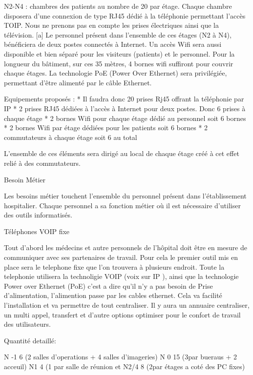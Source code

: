 N2-N4 : chambres des patients au nombre de 20 par étage.  Chaque chambre disposera d’une connexion de type RJ45 dédié à la téléphonie permettant l’accès TOIP. Nous ne prenons pas en compte les prises électriques ainsi que la télévision. [a]
Le personnel présent dans l’ensemble de ces étages (N2 à N4), bénéficiera de deux postes connectés à Internet.
Un accès Wifi sera aussi disponible et bien séparé pour les visiteurs (patients) et le personnel. Pour la longueur du bâtiment, sur ces 35 mètres, 4 bornes wifi suffiront pour couvrir chaque étages. La technologie PoE (Power Over Ethernet) sera privilégiée, permettant d’être alimenté par le câble Ethernet.


Equipements proposés :
* Il faudra donc 20 prises Rj45 offrant la téléphonie par IP
* 2 prises RJ45 dédiées à l’accès à Internet pour deux postes. Donc 6 prises à chaque étage
* 2 bornes Wifi pour chaque étage dédié au personnel soit 6 bornes
* 2 bornes Wifi par étage dédiées pour les patients soit 6 bornes
* 2 commutateurs à chaque étage soit 6 au total


L’ensemble de ces éléments sera dirigé au local de chaque étage créé à cet effet relié à des commutateurs.


Besoin Métier




Les besoins métier touchent l’ensemble du personnel présent dans l’établissement hospitalier. Chaque personnel a sa fonction métier où il est nécessaire d’utiliser des outils informatisés.




Téléphones VOIP fixe


Tout d’abord les médecins et autre personnels de l'hôpital doit être en mesure de communiquer avec ses partenaires de travail. Pour cela le premier outil mis en place sera le telephone fixe que l’on trouvera à plusieurs endroit. Toute la telephonie utilisera la technoligie VOIP (voix sur IP ), ainsi que la technologie Power over Ethernet (PoE) c’est a dire qu’il n’y a pas besoin de Prise d’alimentation, l’alimention passe par les cables ethernet. Cela va facilité l’installation et va permettre de tout centraliser. Il y aura un annuaire centraliser, un multi appel, transfert et d’autre options optimiser pour le confort de travail des utilisateurs.


Quantité detaillé:


N -1 6 (2 salles d’operations + 4 salles d’imageries)
N 0 15 (3par bueraus + 2 acceuil)
N1 4 (1 par salle de réunion et
N2/4 8 (2par étages a coté des PC fixes)

